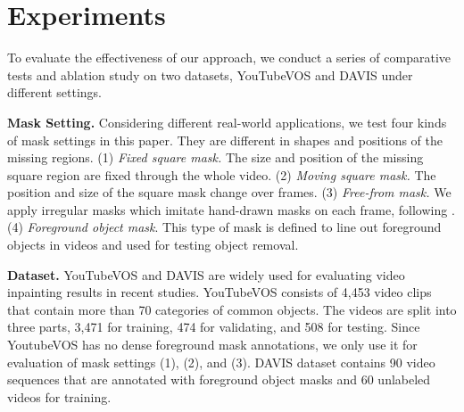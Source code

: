 


\section{Experiments}

To evaluate the effectiveness of our approach, we conduct a series of comparative tests and ablation study on two datasets, YouTubeVOS \cite{xu2018Youtube} and DAVIS \cite{davis_2017} under different settings.

\noindent \textbf{Mask Setting.} Considering different real-world applications, we test four kinds of mask settings in this paper. 
They are different in shapes and positions of the missing regions. 
(1) \emph{Fixed square mask.} The size and position of the missing square region are fixed through the whole video. 
(2) \emph{Moving square mask.} The position and size of the square mask change over frames. 
(3) \emph{Free-from mask.} We apply irregular masks which imitate hand-drawn masks on each frame, following \cite{liu2018partialinpainting}. 
(4) \emph{Foreground object mask}. This type of mask is defined to line out foreground objects in videos and used for testing object removal.

\noindent\textbf{Dataset.} 
YouTubeVOS and DAVIS are widely used for evaluating video inpainting results in recent studies.
YouTubeVOS consists of 4,453 video clips that contain more than 70 categories of common objects. 
The videos are split into three parts, 3,471 for training, 474 for validating, and 508 for testing. Since YoutubeVOS has no dense foreground mask annotations, we only use it for evaluation of mask settings (1), (2), and (3). 
% 
DAVIS dataset contains 90 video sequences that are annotated with foreground object masks and 60 unlabeled videos for training.




